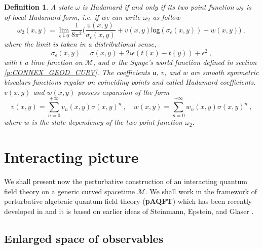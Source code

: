\documentclass[11pt]{book}
\renewcommand{\log}{\mathsf{log}}
\newcommand{\Mcal}{\mathcal{M}}
\newcommand{\usf}{\mathsf{u}}
\theoremstyle{break}
\newtheorem{definition}{Definition}[chapter]
\begin{document}
\begin{definition}\label{def:loc_form_hadamard}
A state $\omega$ is Hadamard if and only if its two point function $\omega_2$ is of local Hadamard form, i.e. if we can write $\omega_2$ as follow
%
\begin{equation*}
\omega_2(x,y) = \lim_{\epsilon \downarrow 0} \frac{1}{8\pi^2} \bigg( \frac{\usf(x,y)}{\sigma_\epsilon(x,y)} + v(x,y) \log\left( \sigma_\epsilon(x,y) \right) + w(x,y) \bigg) \ ,
\end{equation*}
%
where the limit is taken in a distributional sense, 
%
\begin{equation*}
\sigma_\epsilon(x,y) = \sigma(x,y) + 2 i \epsilon \left( t(x) -t(y)\right) + \epsilon^2 \ , 
\end{equation*}
%
with $t$ a time function on $\Mcal$, and $\sigma$ the Synge's world function defined in section \ref{p:CONNEX_GEOD_CURV}. The coefficients $\usf$, $v$, and $w$ are smooth symmetric biscalars functions regular on coinciding points and called Hadamard coefficients. $v(x,y)$ and $w(x,y)$ possess expansion of the form
%
\begin{equation*}
v(x,y) = \sum_{n=0}^{+\infty} v_n(x,y) \sigma(x,y)^n \ , \quad 
w(x,y) = \sum_{n=0}^{+\infty} w_n(x,y) \sigma(x,y)^n \ ,
\end{equation*}
%
where $w$ is the state dependency of the two point function $\omega_2$.
\end{definition}


\section{Interacting picture}
\label{p:INTERACTING_PICTURE}


We shall present now the perturbative construction of an interacting quantum field theory on a generic curved spacetime $\Mcal$. We shall work in the framework of perturbative algebraic quantum field theory (\textbf{pAQFT}) which has been recently developed in \cite{BDF_2009,FR_2014,FR_2013} and it is based on earlier ideas of Steinmann, Epstein, and Glaser \cite{STEINMANN_1971,EG_1973}.


\subsection{Enlarged space of observables}
\label{p:OBS_ENLARGED}
\end{document}
